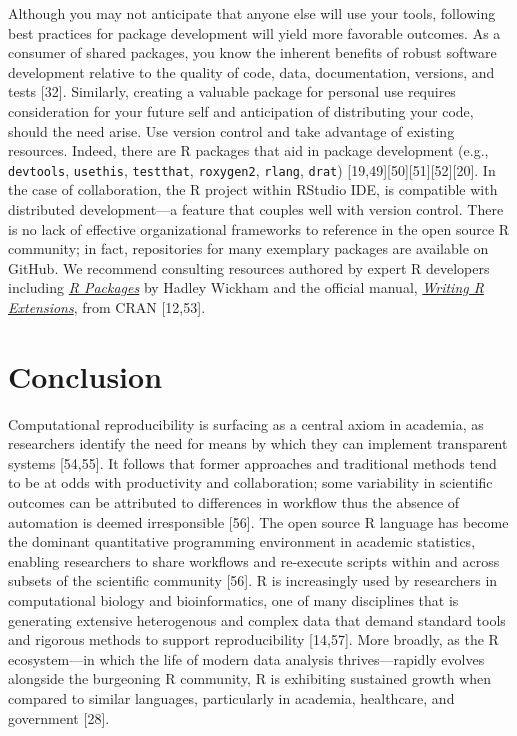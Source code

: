 \documentclass[10pt,letterpaper]{article}
\begin{document}
Although you may not anticipate that anyone else will use your tools,
following best practices for package development will yield more
favorable outcomes. As a consumer of shared packages, you know the
inherent benefits of robust software development relative to the quality
of code, data, documentation, versions, and tests {[}32{]}. Similarly,
creating a valuable package for personal use requires consideration for
your future self and anticipation of distributing your code, should the
need arise. Use version control and take advantage of existing
resources. Indeed, there are R packages that aid in package development
(e.g., \texttt{devtools}, \texttt{usethis}, \texttt{testthat},
\texttt{roxygen2}, \texttt{rlang}, \texttt{drat})
{[}19,49{]}{[}50{]}{[}51{]}{[}52{]}{[}20{]}. In the case of
collaboration, the R project within RStudio IDE, is compatible with
distributed development---a feature that couples well with version
control. There is no lack of effective organizational frameworks to
reference in the open source R community; in fact, repositories for many
exemplary packages are available on GitHub. We recommend consulting
resources authored by expert R developers including
\href{https://r-pkgs.org/}{\emph{R Packages}} by Hadley Wickham and the
official manual,
\href{https://cran.r-project.org/doc/manuals/r-release/R-exts.html}{\emph{Writing
R Extensions}}, from CRAN {[}12,53{]}.

\hypertarget{conclusion}{%
\section{Conclusion}\label{conclusion}}

Computational reproducibility is surfacing as a central axiom in
academia, as researchers identify the need for means by which they can
implement transparent systems {[}54,55{]}. It follows that former
approaches and traditional methods tend to be at odds with productivity
and collaboration; some variability in scientific outcomes can be
attributed to differences in workflow thus the absence of automation is
deemed irresponsible {[}56{]}. The open source R language has become the
dominant quantitative programming environment in academic statistics,
enabling researchers to share workflows and re-execute scripts within
and across subsets of the scientific community {[}56{]}. R is
increasingly used by researchers in computational biology and
bioinformatics, one of many disciplines that is generating extensive
heterogenous and complex data that demand standard tools and rigorous
methods to support reproducibility {[}14,57{]}. More broadly, as the R
ecosystem---in which the life of modern data analysis thrives---rapidly
evolves alongside the burgeoning R community, R is exhibiting sustained
growth when compared to similar languages, particularly in academia,
healthcare, and government {[}28{]}.
\end{document}

